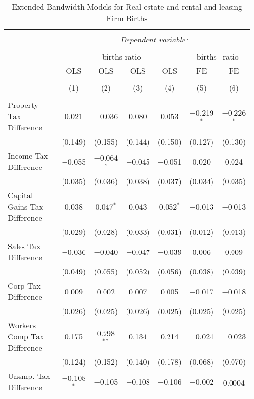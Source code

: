
\begin{table}[!htbp] \centering 
  \caption{Extended Bandwidth Models for  Real estate and rental and leasing Firm Births} 
  \label{53eb} 
\begin{tabular}{@{\extracolsep{5pt}}lcccccc} 
\\[-1.8ex]\hline 
\hline \\[-1.8ex] 
 & \multicolumn{6}{c}{\textit{Dependent variable:}} \\ 
\cline{2-7} 
\\[-1.8ex] & \multicolumn{4}{c}{births ratio} & \multicolumn{2}{c}{births\_ratio} \\ 
 & OLS & OLS & OLS & OLS & FE & FE \\ 
\\[-1.8ex] & (1) & (2) & (3) & (4) & (5) & (6)\\ 
\hline \\[-1.8ex] 
 Property Tax Difference & 0.021 & $-$0.036 & 0.080 & 0.053 & $-$0.219$^{*}$ & $-$0.226$^{*}$ \\ 
  & (0.149) & (0.155) & (0.144) & (0.150) & (0.127) & (0.130) \\ 
  Income Tax Difference & $-$0.055 & $-$0.064$^{*}$ & $-$0.045 & $-$0.051 & 0.020 & 0.024 \\ 
  & (0.035) & (0.036) & (0.038) & (0.037) & (0.034) & (0.035) \\ 
  Capital Gains Tax Difference & 0.038 & 0.047$^{*}$ & 0.043 & 0.052$^{*}$ & $-$0.013 & $-$0.013 \\ 
  & (0.029) & (0.028) & (0.033) & (0.031) & (0.012) & (0.013) \\ 
  Sales Tax Difference & $-$0.036 & $-$0.040 & $-$0.047 & $-$0.039 & 0.006 & 0.009 \\ 
  & (0.049) & (0.055) & (0.052) & (0.056) & (0.038) & (0.039) \\ 
  Corp Tax Difference & 0.009 & 0.002 & 0.007 & 0.005 & $-$0.017 & $-$0.018 \\ 
  & (0.026) & (0.025) & (0.026) & (0.025) & (0.025) & (0.025) \\ 
  Workers Comp Tax Difference & 0.175 & 0.298$^{**}$ & 0.134 & 0.214 & $-$0.024 & $-$0.023 \\ 
  & (0.124) & (0.152) & (0.140) & (0.178) & (0.068) & (0.070) \\ 
  Unemp. Tax Difference & $-$0.108$^{*}$ & $-$0.105 & $-$0.108 & $-$0.106 & $-$0.002 & $-$0.0004 \\ 

\end{tabular}
\end{table}

